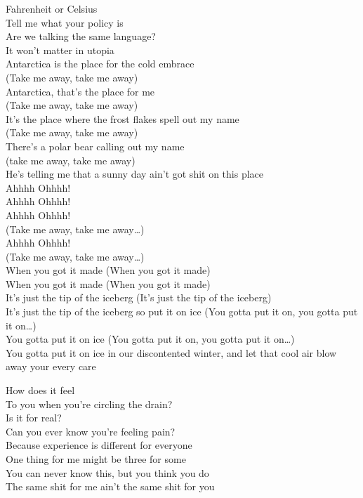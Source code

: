 Fahrenheit or Celsius\\
Tell me what your policy is\\
Are we talking the same language?\\
It won't matter in utopia\\
Antarctica is the place for the cold embrace\\

(Take me away, take me away)\\
Antarctica, that's the place for me\\
(Take me away, take me away)\\
It's the place where the frost flakes spell out my name\\
(Take me away, take me away)\\
There's a polar bear calling out my name\\
(take me away, take me away)\\
He's telling me that a sunny day ain't got shit on this place\\

Ahhhh Ohhhh!\\
Ahhhh Ohhhh!\\
Ahhhh Ohhhh!\\
(Take me away, take me away…)\\
Ahhhh Ohhhh!\\
(Take me away, take me away…)\\

When you got it made (When you got it made)\\
When you got it made (When you got it made)\\
It's just the tip of the iceberg (It's just the tip of the iceberg)\\
It's just the tip of the iceberg so put it on ice (You gotta put it on, you gotta put it on…)\\
You gotta put it on ice (You gotta put it on, you gotta put it on…)\\
You gotta put it on ice in our discontented winter, and let that cool air blow away your every care\\



How does it feel\\
To you when you're circling the drain?\\
Is it for real?\\
Can you ever know you're feeling pain?\\
Because experience is different for everyone\\
One thing for me might be three for some\\
You can never know this, but you think you do\\
The same shit for me ain't the same shit for you\\

